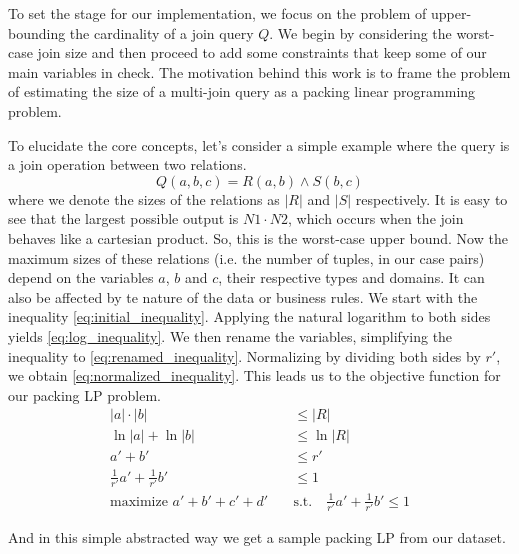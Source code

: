 To set the stage for our implementation, 
we focus on the problem of upper-bounding the 
cardinality of a join query $Q$. 
We begin by considering the worst-case join size and then proceed
to add some constraints that keep some of our main variables in check.
 The motivation behind this work is to frame the problem of 
 estimating the size of a multi-join query as a packing 
 linear programming problem.

To elucidate the core concepts, 
let's consider a simple example 
where the query is a join operation between two relations.
\[
Q(a, b, c) = R(a, b) \land S(b, c)
\]
where we denote the sizes of the relations as
$|R|$ and $|S|$ respectively.
It is easy to see that the largest possible output is $N1 \cdot N2$, which occurs when the join
behaves like a cartesian product. So, this is the worst-case
upper bound.
Now the maximum sizes of these relations (i.e. the number of tuples, in our case pairs) depend on the
variables $a$, $b$ and $c$, their respective types and domains. It can also
be affected by te nature of the data or business rules.
We start with the inequality \ref{eq:initial_inequality}. Applying the natural logarithm to both sides yields \ref{eq:log_inequality}. We then rename the variables, simplifying the inequality to \ref{eq:renamed_inequality}. 
Normalizing by dividing both sides by \(r'\), we obtain \ref{eq:normalized_inequality}. This leads us to the objective function for our packing LP problem.
\begin{align}
    |a| \cdot |b| &\leq |R| \label{eq:initial_inequality} \\
    \ln|a| + \ln|b| &\leq \ln|R| \label{eq:log_inequality} \\
    a' + b' &\leq r' \label{eq:renamed_inequality} \\
    \frac{1}{r'} a' + \frac{1}{r'} b' &\leq 1 \label{eq:normalized_inequality} \\
    \text{maximize } a' + b' + c' + d' \quad &\text{s.t.} \quad \frac{1}{r'} a' + \frac{1}{r'} b' \leq 1 \label{eq:objective_function}
    \end{align}

And in this simple abstracted way we get a sample packing LP from our dataset.
